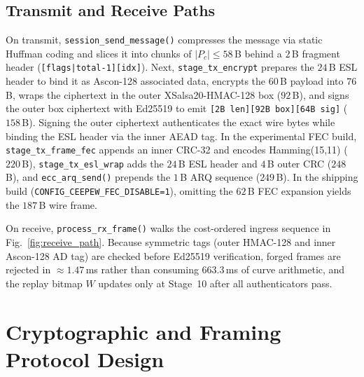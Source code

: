 \documentclass[conference]{IEEEtran}
\begin{document}
\subsection{Transmit and Receive Paths}
On transmit, \texttt{session\_send\_message()} compresses the message via static Huffman coding and slices it into chunks of $|P_c|\le 58$\,B behind a $2$\,B fragment header (\texttt{[flags|total-1][idx]}). Next, \texttt{stage\_tx\_encrypt} prepares the $24$\,B ESL header to bind it as Ascon-128 associated data, encrypts the $60$\,B payload into $76$\,B, wraps the ciphertext in the outer XSalsa20-HMAC-128 box ($92$\,B), and signs the outer box ciphertext with Ed25519 to emit \texttt{[2B len][92B box][64B sig]} ($158$\,B). Signing the outer ciphertext authenticates the exact wire bytes while binding the ESL header via the inner AEAD tag. In the experimental FEC build, \texttt{stage\_tx\_frame\_fec} appends an inner CRC-32 and encodes Hamming(15,11) ($220$\,B), \texttt{stage\_tx\_esl\_wrap} adds the $24$\,B ESL header and $4$\,B outer CRC ($248$\,B), and \texttt{ecc\_arq\_send()} prepends the $1$\,B ARQ sequence ($249$\,B). In the shipping build (\texttt{CONFIG\_CEEPEW\_FEC\_DISABLE=1}), omitting the $62$\,B FEC expansion yields the $187$\,B wire frame.

On receive, \texttt{process\_rx\_frame()} walks the cost-ordered ingress sequence in Fig.~\ref{fig:receive_path}. Because symmetric tags (outer HMAC-128 and inner Ascon-128 AD tag) are checked before Ed25519 verification, forged frames are rejected in $\approx 1.47$\,ms rather than consuming $663.3$\,ms of curve arithmetic, and the replay bitmap $W$ updates only at Stage~10 after all authenticators pass.

\section{Cryptographic and Framing Protocol Design}
\end{document}

